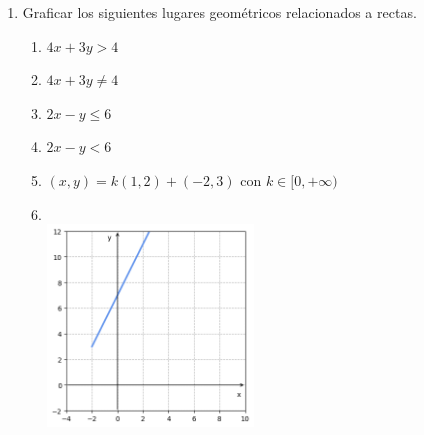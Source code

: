 \documentclass[a4paper]{article}
\newcommand{\answer}{\item[**]}
\newcommand{\exercise}{\item}
\newcommand{\SEL}[1]{\left\{\begin{matrix} #1 \end{matrix}\right.}
\begin{document}
\begin{enumerate}
\begin{enumerate} [label=(\alph*)]
		\item $r_1: x+3y=7$ ~~y~~ $r_2: (x,y)=(4,1)+\alpha (-6,2)$ con $\alpha \in\mathbb{R}$.
		\answer $r_1$ y $r_2$ son coincidentes. La intersección es $r_1 \cap r_2=r_1=r_2$. \href{https://youtu.be/LgIU8pd8DeM?t=884}{Matemáticas con Huais}

		\item $r: 2x-y-3=0$ ~~y~~ $s: (x,y)=(-1,0)+ k (-6,3)$ con $k\in\mathbb{R}$.
		\answer Reemplazamos $\SEL{x=-1-6k \\ y=3k \hfill}$ en $2x-y-3=0$ y obtenemos $k=-\frac{1}{3}$. Por lo tanto, $r \cap s=\left\{ \left(1,-1\right)\right\}$. Además $\overrightarrow{n_r}=(2,-1)$ es paralela a $\overrightarrow{d_s}=(-6,3)$, por lo que $r \perp s$.

		\item $r: y=-\frac{1}{2}x+\frac{3}{2}$ ~~y~~ $s: \frac{1}{4}x+\frac{3}{4}y-3=0$.

		\item $r: (x,y)=(4,2-3k)$ ~~y~~ $s: (x,y)=(2-4h,-3)$ con $k,h\in\mathbb{R}$.

		\item $r: (x,y)=k(3,-2)+(10,5)$ con $k\in\mathbb{R}$ ~~y~~ $s: 2x+3y-35=0$.

	\end{enumerate}
	
	\exercise Graficar los siguientes lugares geométricos relacionados a rectas.
	\begin{multicols}{2}
	\begin{enumerate} [label=(\alph*)]
		
		\item $4x+3y > 4$

		\item $4x+3y \neq 4$

		\item $2x-y \leq 6$

		\item $2x-y < 6$

		\item $(x,y)=k(1,2)+(-2,3)$ con $k\in[0,+\infty)$
		\answer ~\\[-10pt] \includegraphics[width=55mm]{plots/plot1.png}


\end{enumerate}
\end{multicols}
\end{enumerate}
\end{document}
